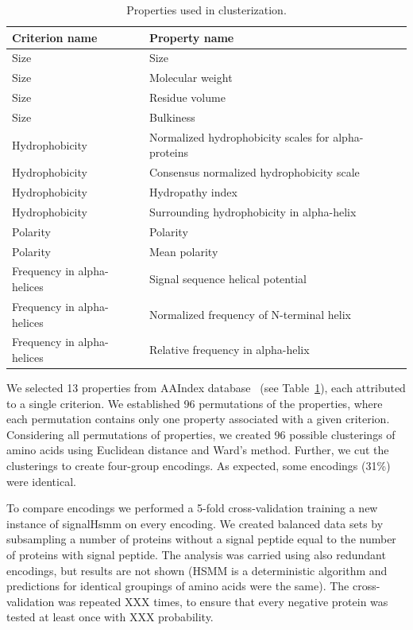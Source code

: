 \documentclass[fleqn,10pt,twoside]{gcb15submission}
\begin{document}
\begin{table}[ht]
\centering
\begin{tabular}{ll}
  \toprule
Criterion name & Property name \\ 
  \midrule
Size & Size \\ 
   \rowcolor[gray]{0.85}Size & Molecular weight \\ 
  Size & Residue volume~\citep{1973goldsackcontribution} \\ 
   \rowcolor[gray]{0.85}Size & Bulkiness~\citep{1968zimmermanthe} \\ 
  Hydrophobicity & Normalized hydrophobicity scales for alpha-proteins~\citep{1992cidhydrophobicity} \\ 
   \rowcolor[gray]{0.85}Hydrophobicity & Consensus normalized hydrophobicity scale~\citep{1984eisenbergthreedimensional} \\ 
  Hydrophobicity & Hydropathy index~\citep{1982kytea} \\ 
   \rowcolor[gray]{0.85}Hydrophobicity & Surrounding hydrophobicity in alpha-helix~\citep{1980ponnuswamyhydrophobic} \\ 
  Polarity & Polarity~\citep{1974granthamamino} \\ 
   \rowcolor[gray]{0.85}Polarity & Mean polarity~\citep{1988radzickainfluences} \\ 
  Frequency in alpha-helices & Signal sequence helical potential~\citep{1982argosstructural} \\ 
   \rowcolor[gray]{0.85}Frequency in alpha-helices & Normalized frequency of N-terminal helix \\ 
  Frequency in alpha-helices & Relative frequency in alpha-helix~\citep{1990prabhakaranthe} \\ 
   \bottomrule
\end{tabular}
\caption{Properties used in clusterization.} 
\label{tab:aaprop}
\end{table}

We selected 13 properties from AAIndex database~\citep{2008kawashimaaaindex} (see Table~\ref{tab:aaprop}), each attributed to a single criterion. We established 96 permutations of the properties, where each permutation contains only one property associated with a given criterion. Considering all permutations of properties, we created 96 possible clusterings of amino acids using Euclidean distance and Ward's method. Further, we cut the clusterings to create four-group encodings. As expected, some encodings (31\%) were identical.

To compare encodings we performed a 5-fold cross-validation training a new instance of signalHsmm on every encoding. We created balanced data sets by subsampling a number of proteins without a signal peptide equal to the number of proteins with signal peptide.
The analysis was carried using also redundant encodings, but results are not shown (HSMM is a deterministic algorithm and predictions for identical groupings of amino acids were the same). The cross-validation was repeated XXX times, to ensure that every negative protein was tested at least once with XXX probability.
\end{document}
